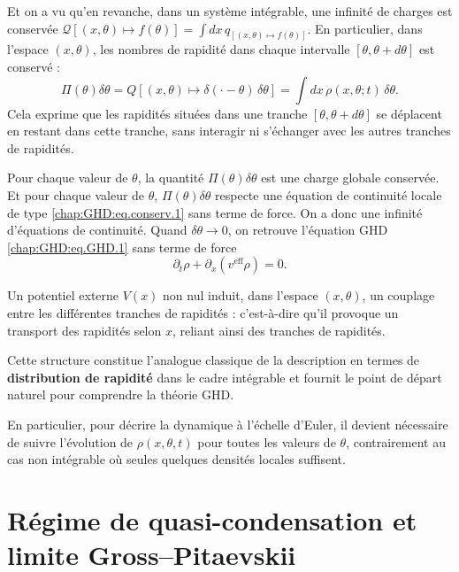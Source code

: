 \medskip

Et on a vu qu'en revanche, dans un système intégrable, une infinité de charges est conservée $\mathcal{Q}[(x,\theta) \mapsto f(\theta)]  =  \int dx \, q_{[(x,\theta) \mapsto f(\theta)]}$. En particulier, dans l'espace $(x,\theta)$, les nombres de rapidité dans chaque intervalle $[\theta , \theta + d\theta]$ est conservé :
\begin{equation*}
\Pi(\theta) \delta \theta  = Q[(x,\theta)  \mapsto \delta(\cdot - \theta) \,  \delta \theta ] = \int dx \, \rho(x,\theta;t)\,  \delta \theta.
\end{equation*}
Cela exprime que les rapidités situées dans une tranche $[\theta , \theta + d\theta]$ se déplacent en restant dans cette tranche, sans interagir ni s’échanger avec les autres tranches de rapidités.

\smallskip

Pour chaque valeur de $\theta$, la quantité $\Pi(\theta) \delta \theta$ est une charge globale conservée. Et pour chaque valeur de $\theta$, $\Pi(\theta) \delta \theta$ respecte une équation de continuité locale de type \eqref{chap:GHD:eq.conserv.1} sans terme de force. On a donc une infinité d'équations de continuité. Quand $\delta \theta \to 0$, on retrouve l'équation \gls{GHD} \eqref{chap:GHD:eq.GHD.1} sans terme de force
\begin{equation}
	\partial_t \rho + \partial_x \!\left(v^{\text{eff}} \rho\right)  = 0.
\end{equation}

Un potentiel externe $V(x)$ non nul induit, dans l’espace $(x,\theta)$, un couplage entre les différentes tranches de rapidités : c’est-à-dire qu’il provoque un transport des rapidités selon $x$, reliant ainsi des tranches de rapidités.

\medskip

Cette structure constitue l’analogue classique de la description en termes de {\bf distribution de rapidité} dans le cadre intégrable et fournit le point de départ naturel pour comprendre la théorie \gls{GHD}. 

\medskip
 
En particulier, pour décrire la dynamique à l’échelle d’Euler, il devient nécessaire de suivre l’évolution de \(\rho(x,\theta,t)\) pour toutes les valeurs de \(\theta\), contrairement au cas non intégrable où seules quelques densités locales suffisent.





\section{Régime de quasi-condensation et limite Gross--Pitaevskii}


